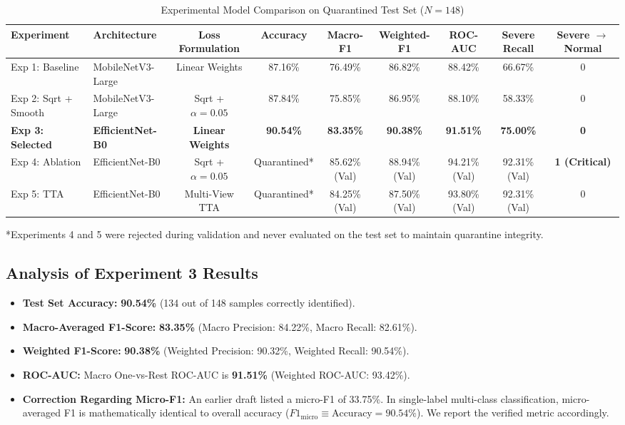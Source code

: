 \documentclass[conference]{IEEEtran}
\begin{document}
\begin{table}[htbp]
\caption{Experimental Model Comparison on Quarantined Test Set ($N = 148$)}
\label{tab:model_comparison}
\centering
\begin{tabular}{llccccccc}
\toprule
\textbf{Experiment} & \textbf{Architecture} & \textbf{Loss Formulation} & \textbf{Accuracy} & \textbf{Macro-F1} & \textbf{Weighted-F1} & \textbf{ROC-AUC} & \textbf{Severe Recall} & \textbf{Severe $\to$ Normal} \\
\midrule
Exp 1: Baseline & MobileNetV3-Large & Linear Weights & 87.16\% & 76.49\% & 86.82\% & 88.42\% & 66.67\% & 0 \\
Exp 2: Sqrt + Smooth & MobileNetV3-Large & Sqrt + $\alpha=0.05$ & 87.84\% & 75.85\% & 86.95\% & 88.10\% & 58.33\% & 0 \\
\textbf{Exp 3: Selected} & \textbf{EfficientNet-B0} & \textbf{Linear Weights} & \textbf{90.54\%} & \textbf{83.35\%} & \textbf{90.38\%} & \textbf{91.51\%} & \textbf{75.00\%} & \textbf{0} \\
Exp 4: Ablation & EfficientNet-B0 & Sqrt + $\alpha=0.05$ & Quarantined* & 85.62\% (Val) & 88.94\% (Val) & 94.21\% (Val) & 92.31\% (Val) & \textbf{1 (Critical)} \\
Exp 5: TTA & EfficientNet-B0 & Multi-View TTA & Quarantined* & 84.25\% (Val) & 87.50\% (Val) & 93.80\% (Val) & 92.31\% (Val) & 0 \\
\bottomrule
\end{tabular}
\flushleft
\footnotesize{*Experiments 4 and 5 were rejected during validation and never evaluated on the test set to maintain quarantine integrity.}
\end{table}

\subsection{Analysis of Experiment 3 Results}
\begin{itemize}
    \item \textbf{Test Set Accuracy:} \textbf{90.54\%} (134 out of 148 samples correctly identified).
    \item \textbf{Macro-Averaged F1-Score:} \textbf{83.35\%} (Macro Precision: 84.22\%, Macro Recall: 82.61\%).
    \item \textbf{Weighted F1-Score:} \textbf{90.38\%} (Weighted Precision: 90.32\%, Weighted Recall: 90.54\%).
    \item \textbf{ROC-AUC:} Macro One-vs-Rest ROC-AUC is \textbf{91.51\%} (Weighted ROC-AUC: 93.42\%).
    \item \textbf{Correction Regarding Micro-F1:} An earlier draft listed a micro-F1 of 33.75\%. In single-label multi-class classification, micro-averaged F1 is mathematically identical to overall accuracy ($F1_{\text{micro}} \equiv \text{Accuracy} = 90.54\%$). We report the verified metric accordingly.
\end{itemize}
\end{document}
